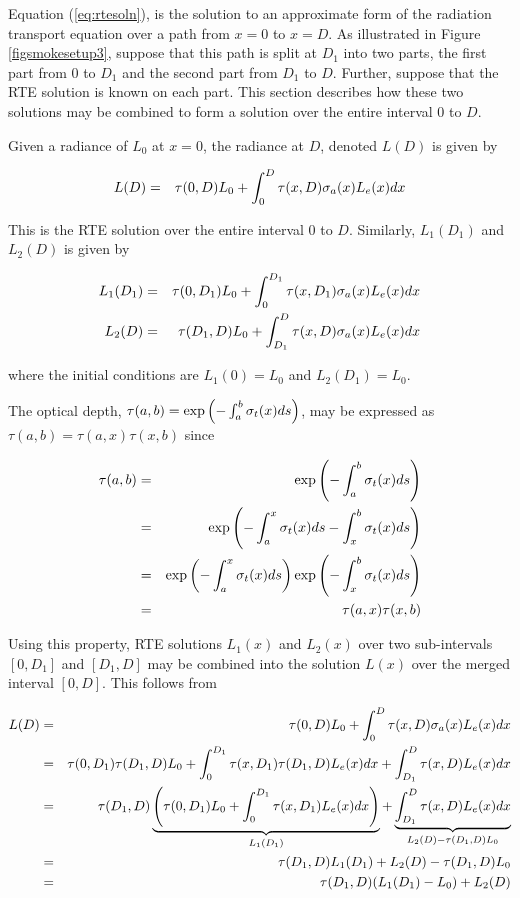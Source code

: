 Equation (\ref{eq:rtesoln}), is the solution to an approximate form of the radiation transport equation over a path from $x=0$ to $x=D$.  As illustrated in Figure \ref{figsmokesetup3}, suppose that this path is split at $D_1$ into two parts, the first part from $0$ to $D_1$ and the second part from $D_1$ to $D$. Further, suppose that the RTE solution is known on each part. This section describes how these two solutions may be combined to form a solution over the entire interval $0$ to $D$.

Given a radiance of $L_0$ at $x=0$, the radiance at $D$, denoted $L(D)$ is given by

\begin{eqnarray}
\label{eq:rtesoln2}
L(D)&=&\tau(0,D)L_0 + \int_0^D\tau(x,D)\sigma_a(x)L_e(x) dx
\end{eqnarray}

This is the RTE solution over the entire interval $0$ to $D$. Similarly, $L_1(D_1)$ and $L_2(D)$ is given by

\begin{eqnarray*}
L_1(D_1)&=&\tau(0,D_1)L_0 + \int_0^{D_1}\tau(x,D_1)\sigma_a(x)L_e(x) dx\\
L_2(D)&=&\tau(D_1,D)L_0 + \int_{D_1}^{D}\tau(x,D)\sigma_a(x)L_e(x) dx
\end{eqnarray*}

where the initial conditions are $L_1(0)=L_0$ and $L_2(D_1)=L_0$.

The optical depth, $\tau(a,b)=\exp\left(-\int_a^b \sigma_t(x) ds\right)$, may be expressed as  $\tau(a,b)=\tau(a,x)\tau(x,b)$ since

\begin{eqnarray*}
\tau(a,b)&=&\exp\left(-\int_a^b \sigma_t(x) ds\right)\\
&=&\exp\left(-\int_a^x \sigma_t(x) ds -\int_x^b \sigma_t(x) ds\right)\\
&=&\exp\left(-\int_a^x \sigma_t(x) ds\right)\exp\left(-\int_x^b \sigma_t(x) ds\right)\\
&=&\tau(a,x)\tau(x,b)
\end{eqnarray*}

Using this property, RTE solutions $L_1(x)$ and $L_2(x)$ over two sub-intervals $[0,D_1]$ and $[D_1,D]$ may be combined into the solution $L(x)$ over the merged interval $[0,D]$.  This follows from

\begin{eqnarray*}
L(D)&=&\tau(0,D)L_0 + \int_0^D\tau(x,D)\sigma_a(x)L_e(x) dx\\
&=&\tau(0,D_1)\tau(D_1,D)L_0 + \int_0^{D_1}\tau(x,D_1)\tau(D_1,D)L_e(x) dx + \int_{D_1}^{D}\tau(x,D)L_e(x) dx\\
&=&\tau(D_1,D)
\underbrace{\left(\tau(0,D_1)L_0 + \int_0^{D_1}\tau(x,D_1)L_e(x) dx\right)}_{L_1(D_1)} +
\underbrace{\int_{D_1}^{D}\tau(x,D)L_e(x) dx}_{L_2(D)-\tau(D_1,D)L_0}\\
&=&\tau(D_1,D)L_1(D_1)+L_2(D)-\tau(D_1,D)L_0\\
&=&\tau(D_1,D)(L_1(D_1)-L_0) + L_2(D)
\end{eqnarray*}

